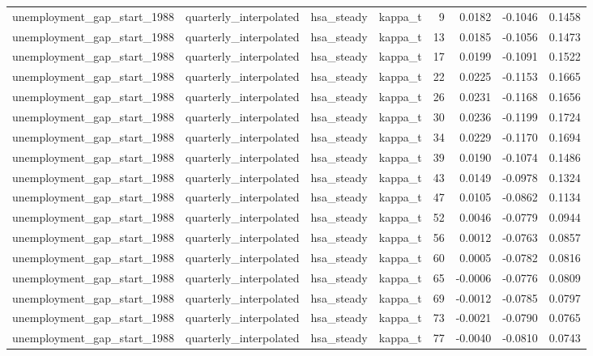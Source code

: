 \begin{tabular}{llllrrrr}
unemployment\_gap\_start\_1988 & quarterly\_interpolated & hsa\_steady & kappa\_t & 9 & 0.0182 & -0.1046 & 0.1458 \\
unemployment\_gap\_start\_1988 & quarterly\_interpolated & hsa\_steady & kappa\_t & 13 & 0.0185 & -0.1056 & 0.1473 \\
unemployment\_gap\_start\_1988 & quarterly\_interpolated & hsa\_steady & kappa\_t & 17 & 0.0199 & -0.1091 & 0.1522 \\
unemployment\_gap\_start\_1988 & quarterly\_interpolated & hsa\_steady & kappa\_t & 22 & 0.0225 & -0.1153 & 0.1665 \\
unemployment\_gap\_start\_1988 & quarterly\_interpolated & hsa\_steady & kappa\_t & 26 & 0.0231 & -0.1168 & 0.1656 \\
unemployment\_gap\_start\_1988 & quarterly\_interpolated & hsa\_steady & kappa\_t & 30 & 0.0236 & -0.1199 & 0.1724 \\
unemployment\_gap\_start\_1988 & quarterly\_interpolated & hsa\_steady & kappa\_t & 34 & 0.0229 & -0.1170 & 0.1694 \\
unemployment\_gap\_start\_1988 & quarterly\_interpolated & hsa\_steady & kappa\_t & 39 & 0.0190 & -0.1074 & 0.1486 \\
unemployment\_gap\_start\_1988 & quarterly\_interpolated & hsa\_steady & kappa\_t & 43 & 0.0149 & -0.0978 & 0.1324 \\
unemployment\_gap\_start\_1988 & quarterly\_interpolated & hsa\_steady & kappa\_t & 47 & 0.0105 & -0.0862 & 0.1134 \\
unemployment\_gap\_start\_1988 & quarterly\_interpolated & hsa\_steady & kappa\_t & 52 & 0.0046 & -0.0779 & 0.0944 \\
unemployment\_gap\_start\_1988 & quarterly\_interpolated & hsa\_steady & kappa\_t & 56 & 0.0012 & -0.0763 & 0.0857 \\
unemployment\_gap\_start\_1988 & quarterly\_interpolated & hsa\_steady & kappa\_t & 60 & 0.0005 & -0.0782 & 0.0816 \\
unemployment\_gap\_start\_1988 & quarterly\_interpolated & hsa\_steady & kappa\_t & 65 & -0.0006 & -0.0776 & 0.0809 \\
unemployment\_gap\_start\_1988 & quarterly\_interpolated & hsa\_steady & kappa\_t & 69 & -0.0012 & -0.0785 & 0.0797 \\
unemployment\_gap\_start\_1988 & quarterly\_interpolated & hsa\_steady & kappa\_t & 73 & -0.0021 & -0.0790 & 0.0765 \\
unemployment\_gap\_start\_1988 & quarterly\_interpolated & hsa\_steady & kappa\_t & 77 & -0.0040 & -0.0810 & 0.0743 \\

\end{tabular}
